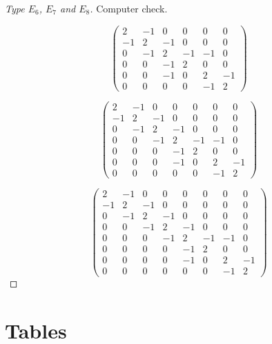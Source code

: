 \documentclass[11pt,a4paper]{amsart}
\theoremstyle{definition}
\begin{document}
\begin{proof}[Type $E_6$,  $E_7$ and  $E_8$] Computer check.
	
\[ \begin{pmatrix}
2 & -1 & 0 & 0 & 0 & 0 \\
-1 & 2 & -1 & 0 & 0 & 0\\
0 & -1 & 2 & -1 & -1 & 0 \\
0 & 0 & -1 & 2 & 0 & 0 \\
0 & 0 & -1 & 0 & 2 & -1 \\
0 & 0 & 0 & 0 & -1 & 2
\end{pmatrix} \]

\[ \begin{pmatrix}
2 & -1 & 0 & 0 & 0 & 0 & 0 \\
-1 & 2 & -1 & 0 & 0 & 0 & 0\\
0 & -1 & 2 & -1 & 0 & 0 & 0 \\
0 & 0 & -1 & 2 & -1 & -1 & 0 \\
0 & 0 & 0 & -1 & 2 & 0 & 0 \\
0 & 0 & 0 & -1 & 0 & 2 & -1 \\
0 & 0 & 0 & 0  & 0 & -1 & 2
\end{pmatrix} \]

\[ \begin{pmatrix}
2 & -1 & 0 & 0 & 0 & 0 & 0 & 0\\
-1 & 2 & -1 & 0 & 0 & 0 & 0 & 0\\
0 & -1 & 2 & -1 & 0 & 0 & 0 & 0 \\
0 & 0 & -1 & 2 & -1 & 0 & 0 & 0 \\
0 & 0 & 0 & -1 & 2 & -1 & -1 & 0 \\
0 & 0 & 0 & 0 & -1 & 2 & 0 & 0 \\
0 & 0 & 0 & 0  & -1 & 0 & 2 & -1 \\
0 & 0 & 0 & 0 & 0  & 0 & -1 & 2
\end{pmatrix} \]
\end{proof}

\section{Tables}
\end{document}
